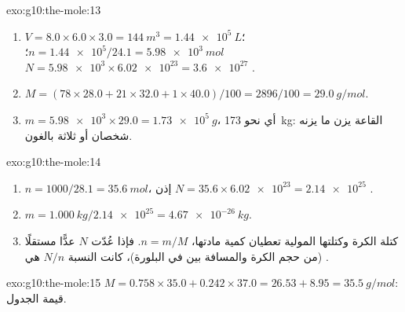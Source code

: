 \begin{solution}{exo:g10:the-mole:13}
\begin{enumerate}
  \item $V = 8.0 \times 6.0 \times 3.0 = \qty{144}{m^3} =
        \qty{1.44e5}{L}$؛ $n = \num{1.44e5} / 24.1 = \qty{5.98e3}{mol}$؛
        $N = \num{5.98e3} \times \num{6.02e23} = \num{3.6e27}$ .
  \item $M = (78 \times 28.0 + 21 \times 32.0 + 1 \times 40.0) / 100 =
        2896 / 100 = \qty{29.0}{g/mol}$.
  \item $m = \num{5.98e3} \times 29.0 = \qty{1.73e5}{g}$، أي نحو
        \qty{173}{kg}:  القاعة يزن ما يزنه شخصان أو ثلاثة
        بالغون.
\end{enumerate}
\end{solution}

\begin{solution}{exo:g10:the-mole:14}
\begin{enumerate}
  \item $n = 1000 / 28.1 = \qty{35.6}{mol}$، إذن
        $N = 35.6 \times \num{6.02e23} = \num{2.14e25}$ .
  \item $m = \qty{1.000}{kg} / \num{2.14e25} = \qty{4.67e-26}{kg}$.
  \item كتلة الكرة وكتلتها المولية تعطيان كمية مادتها،
        $n = m / M$. فإذا عُدّت  $N$ عدًّا مستقلًا (من حجم الكرة
        والمسافة بين  في البلورة)، كانت النسبة $N / n$ هي .
\end{enumerate}
\end{solution}

\begin{solution}{exo:g10:the-mole:15}
$M = 0.758 \times 35.0 + 0.242 \times 37.0 = 26.53 + 8.95 =
\qty{35.5}{g/mol}$: قيمة الجدول.
\end{solution}

